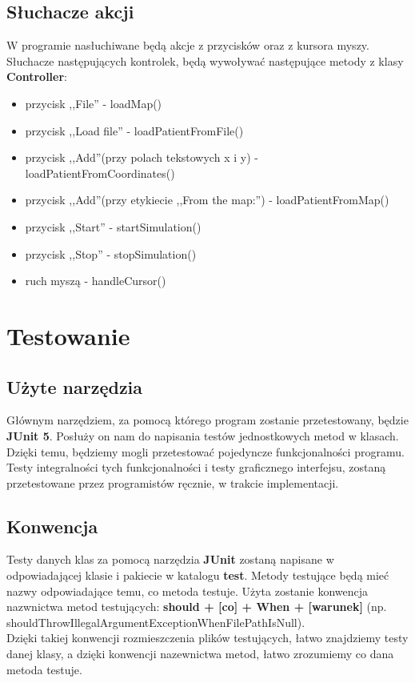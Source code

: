 \documentclass[]{article}
\begin{document}
        \subsection{Słuchacze akcji}
            W programie nasłuchiwane będą akcje z przycisków oraz z kursora myszy.
            Słuchacze następujących kontrolek, będą wywoływać następujące metody z klasy \textbf{Controller}:\\
            \begin{itemize}
                \item przycisk ,,File'' - loadMap()
                \item przycisk ,,Load file'' - loadPatientFromFile()
                \item przycisk ,,Add''(przy polach tekstowych x i y) - loadPatientFromCoordinates()
                \item przycisk ,,Add''(przy etykiecie ,,From the map:'') - loadPatientFromMap()
                \item przycisk ,,Start'' - startSimulation()
                \item przycisk ,,Stop'' - stopSimulation()
                \item ruch myszą - handleCursor()
            \end{itemize}
    
    \section{Testowanie}
        \subsection{Użyte narzędzia}
            Głównym narzędziem, za pomocą którego program zostanie przetestowany, będzie \textbf{JUnit 5}.
            Posłuży on nam do napisania testów jednostkowych metod w klasach.
            Dzięki temu, będziemy mogli przetestować pojedyncze funkcjonalności programu.\\
            Testy integralności tych funkcjonalności i testy graficznego interfejsu, zostaną przetestowane przez programistów ręcznie, w trakcie implementacji.
        
        \subsection{Konwencja}
            Testy danych klas za pomocą narzędzia \textbf{JUnit} zostaną napisane w odpowiadającej klasie i pakiecie
            w katalogu \textbf{test}.
            Metody testujące będą mieć nazwy odpowiadające temu, co metoda testuje.
            Użyta zostanie konwencja nazwnictwa metod testujących: \textbf{should + [co] + When + [warunek]}
            (np. shouldThrowIllegalArgumentExceptionWhenFilePathIsNull).\\
            Dzięki takiej konwencji rozmieszczenia plików testujących, łatwo znajdziemy testy danej klasy,
            a dzięki konwencji nazewnictwa metod, łatwo zrozumiemy co dana metoda testuje.
        
\end{document}
